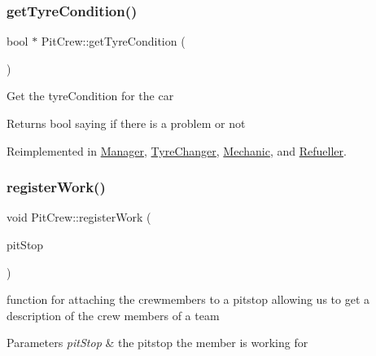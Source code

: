 \mbox{\label{class_pit_crew_a7a527a6b4eccb6570dcad04b04dc1177}} 
\subsubsection{\texorpdfstring{get\+Tyre\+Condition()}{getTyreCondition()}}
{\footnotesize\ttfamily bool $\ast$ Pit\+Crew\+::get\+Tyre\+Condition (\begin{DoxyParamCaption}{ }\end{DoxyParamCaption})\hspace{0.3cm}{\ttfamily [virtual]}}

Get the tyre\+Condition for the car \begin{DoxyReturn}{Returns}
bool saying if there is a problem or not 
\end{DoxyReturn}


Reimplemented in \mbox{\hyperlink{class_manager_ae4984934c5751a4cfd5932370191b67d}{Manager}}, \mbox{\hyperlink{class_tyre_changer_afdd2bc9ac35d7e5449a9e0c5ee39b450}{Tyre\+Changer}}, \mbox{\hyperlink{class_mechanic_aed7f46c76c75b647527c041ff5082f6e}{Mechanic}}, and \mbox{\hyperlink{class_refueller_a4ccfe56b7f490244776856fc5b8c0d45}{Refueller}}.

\mbox{\label{class_pit_crew_acf65dc9104c4286e663926689e7a3803}} 
\subsubsection{\texorpdfstring{register\+Work()}{registerWork()}}
{\footnotesize\ttfamily void Pit\+Crew\+::register\+Work (\begin{DoxyParamCaption}\item[{\mbox{\hyperlink{class_pit_stop}{Pit\+Stop}} $\ast$}]{pit\+Stop }\end{DoxyParamCaption})}

function for attaching the crewmembers to a pitstop allowing us to get a description of the crew members of a team 
\begin{DoxyParams}{Parameters}
{\em pit\+Stop} & the pitstop the member is working for \\
\hline
\end{DoxyParams}
\mbox{\label{class_pit_crew_a41051dd7081efeac022cc3a35a592c64}} 
